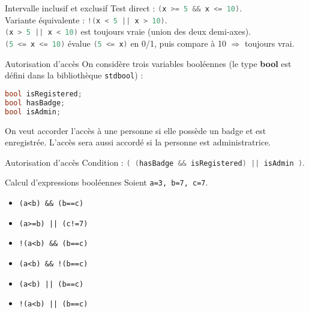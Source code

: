 \begin{UPSTIprofOnlyEnv}
  \begin{UPSTIcorrectionP}{Intervalle inclusif et exclusif}
    Test direct : \lstinline[language=C]{(x >= 5 && x <= 10)}.  \\
    Variante équivalente : \lstinline[language=C]{!(x < 5 || x > 10)}.  \\
    \lstinline[language=C]{(x > 5 || x < 10)} est toujours vraie (union des deux demi-axes).  \\
    \lstinline[language=C]{(5 <= x <= 10)} évalue \lstinline[language=C]{(5 <= x)} en 0/1, puis compare à 10 $\Rightarrow$ toujours vrai.
  \end{UPSTIcorrectionP}
\end{UPSTIprofOnlyEnv}

\begin{UPSTIexercice}{Autorisation d'accès}
On considère trois variables booléennes (le type \textbf{bool} est défini dans la bibliothèque \texttt{stdbool}) :
\begin{lstlisting}[language=c]
bool isRegistered;
bool hasBadge; 
bool isAdmin;
\end{lstlisting}

On veut accorder l'accès à une personne si elle possède un badge et est enregistrée. L'accès sera aussi accordé si la personne est administratrice.
\end{UPSTIexercice}

\begin{UPSTIprofOnlyEnv}
  \begin{UPSTIcorrectionP}{Autorisation d'accès}
    Condition : \lstinline[language=C]{( (hasBadge && isRegistered) || isAdmin )}.
  \end{UPSTIcorrectionP}
\end{UPSTIprofOnlyEnv}

\begin{UPSTIexercice}{Calcul d'expressions booléennes}
Soient \verb|a=3, b=7, c=7|.
\begin{multicols}{3}
\begin{itemize}
    \item \verb|(a<b) && (b==c)|
    \item \verb$(a>=b) || (c!=7)$
    \item \verb|!(a<b) && (b==c)|
    \item \verb|(a<b) && !(b==c)|
    \item \verb$(a<b) || (b==c)$
    \item \verb$!(a<b) || (b==c)$
\end{itemize}
\end{multicols}
\end{UPSTIexercice}

